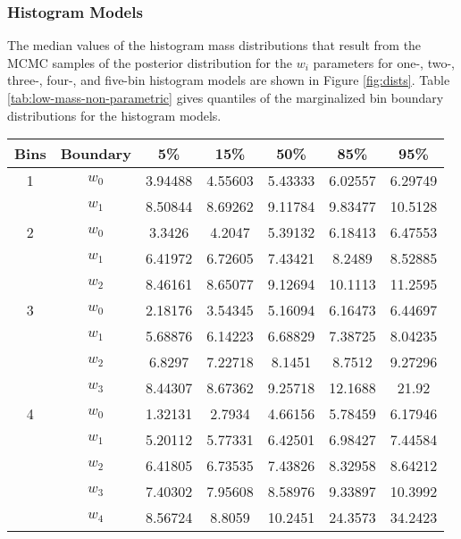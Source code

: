 \documentclass[preprint]{aastex}
\begin{document}
\subsubsection{Histogram Models}

The median values of the histogram mass distributions that result from
the MCMC samples of the posterior distribution for the $w_i$
parameters for one-, two-, three-, four-, and five-bin histogram
models are shown in Figure \ref{fig:dists}.  Table
\ref{tab:low-mass-non-parametric} gives quantiles of the marginalized
bin boundary distributions for the histogram models.

\begin{table}
  \begin{center}
    \begin{tabular}{|c|c|c|c|c|c|c|}
      \hline
      Bins & Boundary & 5\% & 15\% & 50\% & 85\% & 95\% \\
      \hline \hline
      1 & $w_0$ & 3.94488 & 4.55603 & 5.43333 & 6.02557 & 6.29749 \\
      \hline
        & $w_1$ & 8.50844 & 8.69262 & 9.11784 & 9.83477 & 10.5128 \\
      \hline \hline
      2 & $w_0$ & 3.3426 & 4.2047 & 5.39132 & 6.18413 & 6.47553 \\
      \hline
        & $w_1$ & 6.41972 & 6.72605 & 7.43421 & 8.2489 & 8.52885 \\
      \hline
        & $w_2$ & 8.46161 & 8.65077 & 9.12694 & 10.1113 & 11.2595 \\
      \hline \hline
      3 & $w_0$ & 2.18176 & 3.54345 & 5.16094 & 6.16473 & 6.44697 \\
      \hline
        & $w_1$ & 5.68876 & 6.14223 & 6.68829 & 7.38725 & 8.04235 \\
      \hline
        & $w_2$ & 6.8297 & 7.22718 & 8.1451 & 8.7512 & 9.27296 \\
      \hline
        & $w_3$ & 8.44307 & 8.67362 & 9.25718 & 12.1688 & 21.92 \\
      \hline \hline
      4 & $w_0$ & 1.32131 & 2.7934 & 4.66156 & 5.78459 & 6.17946 \\
      \hline
        & $w_1$ & 5.20112 & 5.77331 & 6.42501 & 6.98427 & 7.44584 \\
      \hline
        & $w_2$ & 6.41805 & 6.73535 & 7.43826 & 8.32958 & 8.64212 \\
      \hline
        & $w_3$ & 7.40302 & 7.95608 & 8.58976 & 9.33897 & 10.3992 \\
      \hline
        & $w_4$ & 8.56724 & 8.8059 & 10.2451 & 24.3573 & 34.2423 \\

\end{tabular}
\end{center}
\end{table}
\end{document}
